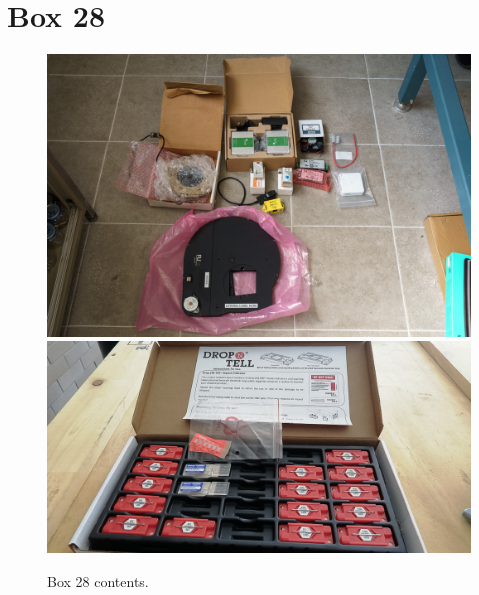 \documentclass{article}
\begin{document}

\clearpage
\section{Box 28}

\begin{figure}[bp]
\begin{center}
\includegraphics[width=0.80\linewidth]{figures/20201209T140203.jpg}
\includegraphics[width=0.80\linewidth]{figures/20210108T140347.jpg}
\end{center}
\caption{Box 28 contents.}
\label{figure:box-twenty-eight-contents}
\end{figure}
\end{document}
